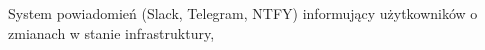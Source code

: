 
    \item System powiadomień (Slack, Telegram, NTFY) informujący użytkowników o zmianach w stanie infrastruktury,